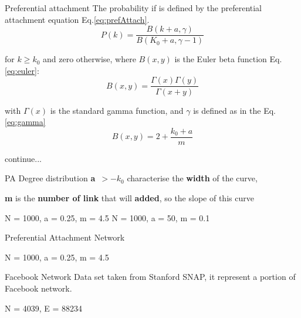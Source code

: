 \documentclass{beamer}
\begin{document}
	\begin{frame}{Preferential attachment}
		The probability if is defined by the preferential attachment equation Eq.\ref{eq:prefAttach}.
        \begin{equation}\label{eq:prefAttach}
          P(k) = \frac{B(k+a,\gamma)}{B(K_0 + a, \gamma - 1)}
        \end{equation}
        
        for $k \geq k_0$ and zero otherwise, where $B(x,y)$ is the Euler beta function Eq.\ref{eq:euler}:
        \begin{equation}\label{eq:euler}
          B(x,y) = \frac{\Gamma(x)\Gamma(y)}{\Gamma(x+y)}
        \end{equation}
        
        with $\Gamma(x)$ is the standard gamma function, and $\gamma$ is defined as in the  Eq.\ref{eq:gamma}
        \begin{equation}\label{eq:gamma}
          B(x,y) = 2+ \frac{k_0+a}{m}
        \end{equation}
        
        \hfill{continue...}
        
    \end{frame}
    
    \begin{frame}{PA Degree distribution}
        \textbf{a}~$> -k_0$ characterise the \textbf{width} of the curve,
        
        \textbf{m} is the \textbf{number of link} that will \textbf{added}, so the slope of this curve
        
        \begin{left}
		\end{left}
		
		\footnotesize{
		    N = 1000,
		    a = 0.25,
		    m = 4.5
		}
		\hfill
		\footnotesize{
		    N = 1000,
		    a = 50,
		    m = 0.1
		}
	\end{frame}
	
	\begin{frame}{Preferential Attachment Network}
	    \begin{center}
		\end{center}
	    \footnotesize{
		    N = 1000,
		    a = 0.25,
		    m = 4.5
		}
	\end{frame}
	
	\begin{frame}{Facebook Network}
	    Data set taken from Stanford SNAP, it represent a portion of Facebook network.
	    \begin{center}
		\end{center}
	    \footnotesize{
		    N = 4039,
		    E = 88234
		}
	\end{frame}
	
\end{document}
